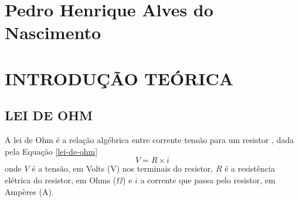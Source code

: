\documentclass[12pt]{article}
\begin{document}
    
    
    \listoftables
    \thispagestyle{empty}
    \newpage

    \listoffigures
    \thispagestyle{empty}
    \newpage

    \tableofcontents
    \thispagestyle{empty}
    \newpage

    \section*{Pedro Henrique Alves do Nascimento}
    \section{INTRODUÇÃO TEÓRICA}
    \subsection{LEI DE OHM}
    A lei de Ohm é a relação algébrica entre corrente tensão para um resistor \parencite[][, p. 32]{nilsson}, dada pela Equação \ref{lei-de-ohm}
    \begin{equation}
        V=R\times i \label{lei-de-ohm}
    \end{equation}
    onde $V$ é a tensão, em Volts (V) nos terminais do resistor, $R$ é a resistência elétrica do resistor, em Ohms ($\Omega$) e $i$ a corrente que passa pelo resistor, em Ampères (A).
\end{document}
